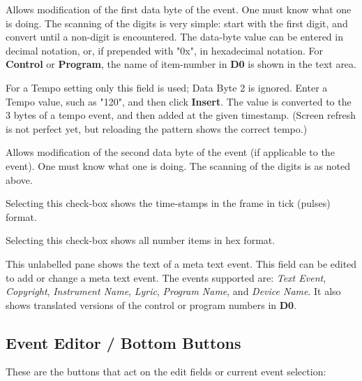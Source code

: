    Allows modification of the first data byte of the event.
   One must know what one is doing.
   The scanning of the digits is very simple:  start with the first digit, and
   convert until a non-digit is encountered.  The data-byte value can be
   entered in decimal notation, or, if prepended with "0x", in hexadecimal
   notation.
   For \textbf{Control} or \textbf{Program},
   the name of item-number in \textbf{D0} is
   shown in the text area.

   For a Tempo setting only this field is used; Data Byte 2 is ignored.
   Enter a Tempo value, such as "120", and then click \textbf{Insert}. The
   value is converted to the 3 bytes of a tempo event, and then
   added at the given timestamp.  (Screen refresh is not perfect yet, but
   reloading the pattern shows the correct tempo.)

   Allows modification of the second data byte of the event (if applicable
   to the event).
   One must know what one is doing.
   The scanning of the digits is as noted above.

   Selecting this check-box
   shows the time-stamps in the frame in tick (pulses) format.

   Selecting this check-box
   shows all number items in hex format.

   This unlabelled pane shows the text of a meta text event.
   This field can be edited to add or change a meta text event.
   The events supported are:
   \textsl{Text Event},
   \textsl{Copyright},
   \textsl{Instrument Name},
   \textsl{Lyric},
   \textsl{Program Name}, and
   \textsl{Device Name}.
   It also shows translated versions of the control or program numbers in
   \textbf{D0}.


\subsection{Event Editor / Bottom Buttons}
\label{subsec:event_editor_buttons}

   These are the buttons that act on the edit fields or current event
   selection:

